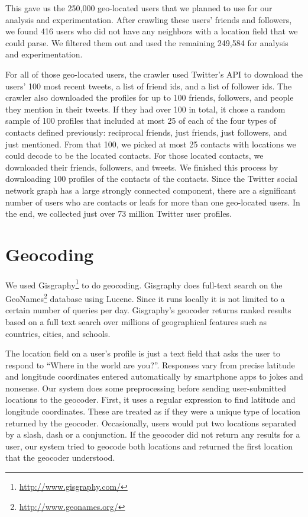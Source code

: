 This gave us the 250,000 geo-located users that we planned to use for our
analysis and experimentation.
After crawling these users' friends and followers, we found 416 users who did
not have any neighbors with a location field that we could parse.
We filtered them out and used the remaining 249,584 for analysis and
experimentation.

For all of those geo-located users, the crawler used Twitter's API to download
the users' 100 most recent tweets, a list of friend ids, and a list of follower ids.
The crawler also downloaded the profiles for up to 100 friends, followers, and
people they mention in their tweets.
%
If they had over 100 in total, it chose a random sample of 100 profiles that
included at most 25 of each of the four types of contacts defined previously:
reciprocal friends, just friends, just followers, and just mentioned.
%
From that 100, we picked at most 25 contacts with locations we could decode to
be the located contacts. For those located contacts, we downloaded their
friends, followers, and tweets.
%
We finished this process by downloading 100 profiles of the contacts of the
contacts.
%
Since the Twitter social network graph has a large strongly connected
component, there are a significant number of users who are contacts or leafs for
more than one geo-located users.
%
In the end, we collected just over 73 million Twitter user profiles.

\section{Geocoding}
We used Gisgraphy\footnote{\url{http://www.gisgraphy.com/}} to do geocoding.
Gisgraphy does full-text search on the GeoNames\footnote{\url{http://www.geonames.org/}}
database using Lucene. Since
it runs locally it is not limited to a certain number of queries per day.
Gisgraphy's geocoder returns ranked results based on a full text search
over millions of geographical features such as countries, cities, and schools.

The location field on a user's profile is just a text field that asks the user
to respond to ``Where in the world are you?''.
Responses vary from precise latitude and longitude coordinates entered
automatically by smartphone apps to jokes and nonsense.
Our system does some preprocessing before sending user-submitted locations to
the geocoder.
First, it uses a regular expression to find latitude and longitude coordinates.
These are treated as if they were a unique type of location returned by the
geocoder.
Occasionally, users would put two locations separated by a slash, dash or a
conjunction.
If the geocoder did not return any results for a user, our system tried to
geocode both locations and returned the first location that the geocoder
understood.

